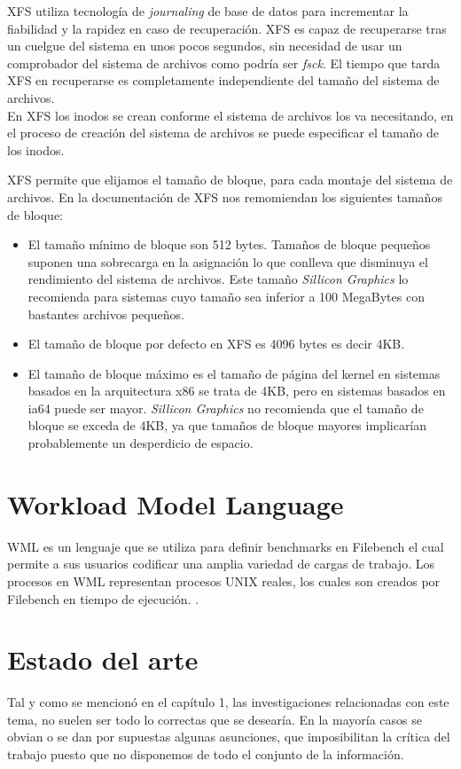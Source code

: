 XFS utiliza tecnología de \textit{journaling} de base de datos para incrementar la fiabilidad y la rapidez en caso de recuperación. XFS es capaz de recuperarse tras un cuelgue del sistema en unos pocos segundos, sin necesidad de usar un comprobador del sistema de archivos como podría ser \textit{fsck}. El tiempo que tarda XFS en recuperarse es completamente independiente del tamaño del sistema de archivos.\\

En XFS los inodos se crean conforme el sistema de archivos los va necesitando, en el proceso de creación del sistema de archivos se puede especificar el tamaño de los inodos.

XFS permite que elijamos el tamaño de bloque, para cada montaje del sistema de archivos. En la documentación de XFS nos remomiendan los siguientes tamaños de bloque:
\begin{itemize}
    \item El tamaño mínimo de bloque son 512 bytes. Tamaños de bloque pequeños suponen una sobrecarga en la asignación lo que conlleva que disminuya el rendimiento del sistema de archivos. Este tamaño \textit{Sillicon Graphics} lo recomienda para sistemas cuyo tamaño sea inferior a 100 MegaBytes con bastantes archivos pequeños.
    
    \item El tamaño de bloque por defecto en XFS es 4096 bytes es decir 4KB.
    \item El tamaño de bloque máximo es el tamaño de página del kernel en sistemas basados en la arquitectura x86 se trata de 4KB, pero en sistemas basados en ia64 puede ser mayor. \textit{Sillicon Graphics} no recomienda que el tamaño de bloque se exceda de 4KB, ya que tamaños de bloque mayores implicarían probablemente un desperdicio de espacio.
\end{itemize}

\section{Workload Model Language}
WML es un lenguaje que se utiliza para definir benchmarks en Filebench el cual permite a sus usuarios codificar una amplia variedad de cargas de trabajo. Los procesos  en WML representan procesos UNIX reales, los cuales son creados por Filebench en tiempo de ejecución. \cite{Tarasov2016FilebenchAF}. 


\section{Estado del arte}
Tal y como se mencionó en el capítulo 1, las investigaciones relacionadas con este tema, no suelen ser todo lo correctas que se desearía. En la mayoría casos se obvian o se dan por supuestas algunas asunciones, que imposibilitan la crítica del trabajo puesto que no disponemos de todo el conjunto de la información. \\

